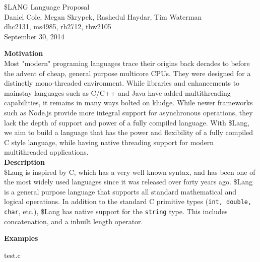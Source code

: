 \documentclass[11pt, oneside]{article}   	%
\date{}							%
\begin{document}
\begin{center}
\LARGE
\$LANG Language Proposal\\[2em]
\Large 
Daniel Cole, Megan Skrypek, Rashedul Haydar, Tim Waterman\\
\large dhc2131, ms4985, rh2712, tbw2105\\[2em]
\normalsize
September 30, 2014\\[3em]
\end{center}

\LARGE\textbf{Motivation}\\[.5em]
\normalsize
Most "modern" programing languages trace their origins back decades to before the advent of cheap, general purpose multicore CPUs.  They were designed for a distinctly mono-threaded environment.  While libraries and enhancements to mainstay languages such as C/C++ and Java have added multithreading capabilities, it remains in many ways bolted on kludge.  While newer frameworks such as Node.js provide more integral support for asynchronous operations, they lack the depth of support and power of a fully compiled language.  With \$Lang, we aim to build a language that has the power and flexibility of a fully compiled C style language, while having native threading support for modern multithreaded applications.
\\[3em]
\LARGE\textbf{Description}\\[.5em]
\normalsize
\$Lang is inspired by C, which has a very well known syntax, and has been one of the most widely used languages since it was released over forty years ago.  \$Lang is a general purpose language that supports all standard mathematical and logical operations.  In addition to the standard C primitive types (\verb|int, double, char|, etc.), \$Lang has native support for the \verb|string| type.  This includes concatenation, and a inbuilt length operator. 

\newpage

\LARGE\textbf{Examples}\\[.5em]
\normalsize

{test.c}
\end{document}
